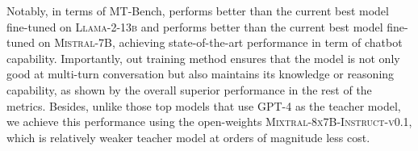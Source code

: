 Notably, in terms of MT-Bench, \textsc{\labl} performs better than the current best model fine-tuned on \textsc{Llama-2-13b} and \textsc{\labm} performs better than the current best model fine-tuned on \textsc{Mistral-7B}, achieving state-of-the-art performance in term of chatbot capability.
Importantly, out training method ensures that the model is not only good at multi-turn conversation but also maintains its knowledge or reasoning capability, as shown by the overall superior performance in the rest of the metrics.
Besides, unlike those top models that use GPT-4 as the teacher model, we achieve this performance using the open-weights \textsc{
Mixtral-8x7B-Instruct-v0.1}, which is relatively weaker teacher model at orders of magnitude less cost.

